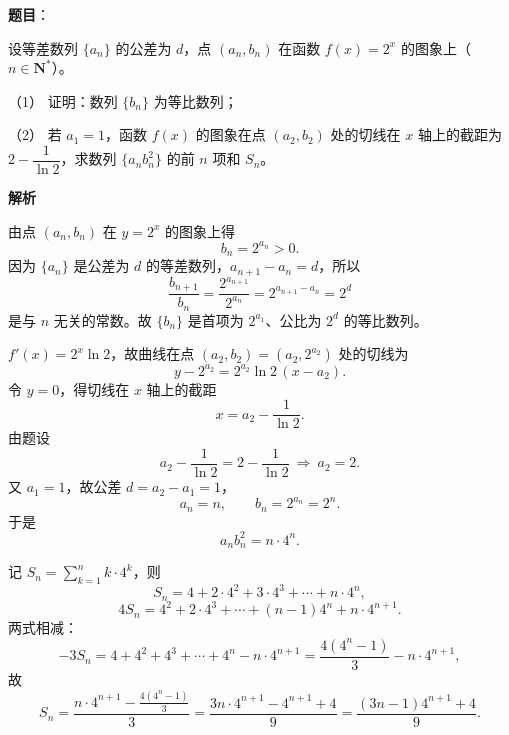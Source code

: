 \begin{answer}

\textbf{题目}：

设等差数列 $\{a_n\}$ 的公差为 $d$，点 $(a_n,b_n)$ 在函数 $f(x)=2^x$ 的图象上（$n\in\mathbf N^*$）。

（1） 证明：数列 $\{b_n\}$ 为等比数列；

（2） 若 $a_1=1$，函数 $f(x)$ 的图象在点 $(a_2,b_2)$ 处的切线在 $x$ 轴上的截距为 $2-\dfrac1{\ln 2}$，求数列 $\{a_nb_n^2\}$ 的前 $n$ 项和 $S_n$。

\textbf{解析}


由点 $(a_n,b_n)$ 在 $y=2^x$ 的图象上得
\nopagebreak[4]
\[b_n=2^{a_n}>0 .\]
因为 $\{a_n\}$ 是公差为 $d$ 的等差数列，$a_{n+1}-a_n=d$，所以
\nopagebreak[4]
\[\frac{b_{n+1}}{b_n}=\frac{2^{a_{n+1}}}{2^{a_n}}=2^{a_{n+1}-a_n}=2^d\]
是与 $n$ 无关的常数。故 $\{b_n\}$ 是首项为 $2^{a_1}$、公比为 $2^d$ 的等比数列。


$f'(x)=2^x\ln2$，故曲线在点 $(a_2,b_2)=(a_2,2^{a_2})$ 处的切线为
\nopagebreak[4]
\[y-2^{a_2}=2^{a_2}\ln2\,(x-a_2).\]
令 $y=0$，得切线在 $x$ 轴上的截距
\nopagebreak[4]
\[x=a_2-\frac1{\ln2} .\]
由题设
\nopagebreak[4]
\[a_2-\frac1{\ln2}=2-\frac1{\ln2}\ \Longrightarrow\ a_2=2 .\]
又 $a_1=1$，故公差 $d=a_2-a_1=1$，
\nopagebreak[4]
\[a_n=n,\qquad b_n=2^{a_n}=2^n .\]
于是
\nopagebreak[4]
\[a_nb_n^2=n\cdot 4^n .\]

记 $S_n=\displaystyle\sum_{k=1}^n k\cdot4^k$，则
\nopagebreak[4]
\[S_n=4+2\cdot4^2+3\cdot4^3+\cdots+n\cdot4^n,\]
\nopagebreak[4]
\[4S_n=4^2+2\cdot4^3+\cdots+(n-1)4^n+n\cdot4^{n+1}.\]
两式相减：
\nopagebreak[4]
\[-3S_n=4+4^2+4^3+\cdots+4^n-n\cdot4^{n+1}
=\frac{4(4^n-1)}3-n\cdot4^{n+1},\]
故
\nopagebreak[4]
\[S_n=\frac{n\cdot4^{n+1}-\frac{4(4^n-1)}3}{3}
=\frac{3n\cdot4^{n+1}-4^{n+1}+4}{9}
=\frac{(3n-1)4^{n+1}+4}{9}.\]



\end{answer}
